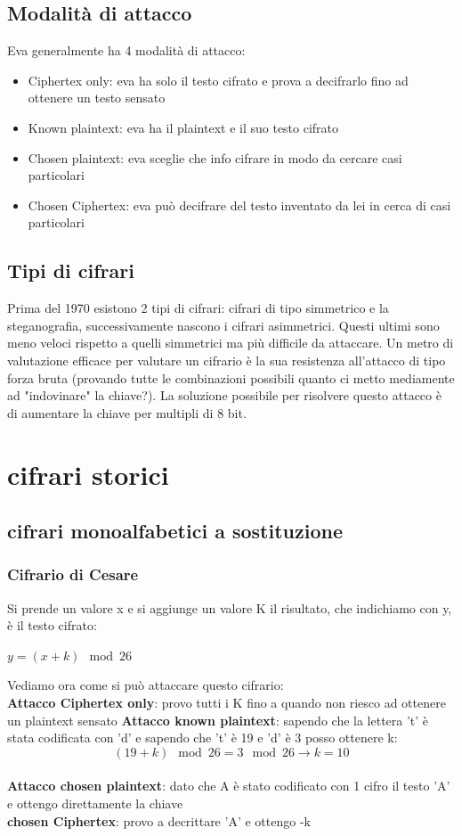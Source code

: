 \documentclass[10pt,a4paper]{article}
\begin{document}
\subsection{Modalità di attacco}
Eva generalmente ha 4 modalità di attacco:\\
\begin{itemize}
\item Ciphertex only: eva ha solo il testo cifrato e prova a decifrarlo fino ad ottenere un testo sensato
\item Known plaintext: eva ha il plaintext e il suo testo cifrato
\item Chosen plaintext: eva sceglie che info cifrare in modo da cercare casi particolari
\item Chosen Ciphertex: eva può decifrare del testo inventato da lei in cerca di casi particolari
\end{itemize}
\subsection{Tipi di cifrari}
Prima del 1970 esistono 2 tipi di cifrari: cifrari di tipo simmetrico e la steganografia, successivamente nascono i cifrari asimmetrici. Questi ultimi sono meno veloci rispetto a quelli simmetrici ma più difficile da attaccare. Un metro di valutazione efficace per valutare un cifrario è la sua resistenza all'attacco di tipo forza bruta (provando tutte le combinazioni possibili quanto ci metto mediamente ad "indovinare" la chiave?). La soluzione possibile per risolvere questo attacco è di aumentare la chiave per multipli di 8 bit.

\section{cifrari storici}
\subsection{cifrari monoalfabetici a sostituzione}
\subsubsection{Cifrario di Cesare}
Si prende un valore x e si aggiunge un valore K il risultato, che indichiamo con y, è il testo cifrato:
\begin{center}
$y=(x+k)\mod26$
\end{center}
Vediamo ora come si può attaccare questo cifrario:\\
\textbf{Attacco Ciphertex only}: provo tutti i K fino a quando non riesco ad ottenere un plaintext sensato
\textbf{Attacco known plaintext}: sapendo che la lettera 't' è stata codificata con 'd' e sapendo che 't' è 19 e 'd' è 3 posso ottenere k:\\
$$(19+k)\mod26 = 3\mod26 \rightarrow k=10$$\\
\textbf{Attacco chosen plaintext}: dato che A è stato codificato con 1 cifro il testo 'A' e ottengo direttamente la chiave\\
\textbf{chosen Ciphertex}: provo a decrittare 'A' e ottengo -k
\end{document}
